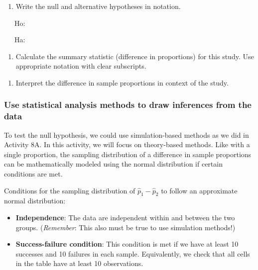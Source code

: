 \documentclass[
]{report}
\providecommand{\tightlist}{%
  \setlength{\itemsep}{0pt}\setlength{\parskip}{0pt}}
\begin{document}
\begin{enumerate}
\def\labelenumi{\arabic{enumi}.}
\setcounter{enumi}{1}
\tightlist
\item
  Write the null and alternative hypotheses in notation.
\end{enumerate}

~~~Ho:

\vspace{0.2in}

~~~Ha:

\vspace{0.2in}

\begin{enumerate}
\def\labelenumi{\arabic{enumi}.}
\setcounter{enumi}{2}
\tightlist
\item
  Calculate the summary statistic (difference in proportions) for this study. Use appropriate notation with clear subscripts.
\end{enumerate}

\vspace{0.5in}

\begin{enumerate}
\def\labelenumi{\arabic{enumi}.}
\setcounter{enumi}{3}
\tightlist
\item
  Interpret the difference in sample proportions in context of the study.
  \vspace{0.8in}
\end{enumerate}

\hypertarget{use-statistical-analysis-methods-to-draw-inferences-from-the-data-3}{%
\subsubsection*{Use statistical analysis methods to draw inferences from the data}\label{use-statistical-analysis-methods-to-draw-inferences-from-the-data-3}}

To test the null hypothesis, we could use simulation-based methods as we did in Activity 8A. In this activity, we will focus on theory-based methods. Like with a single proportion, the sampling distribution of a difference in sample proportions can be mathematically modeled using the normal distribution if certain conditions are met.

Conditions for the sampling distribution of \(\hat{p}_1-\hat{p}_2\) to follow an approximate normal distribution:

\begin{itemize}
\item
  \textbf{Independence}: The data are independent within and between the two groups. (\emph{Remember}: This also must be true to use simulation methods!)
\item
  \textbf{Success-failure condition}: This condition is met if we have at least 10 successes and 10 failures in each sample. Equivalently, we check that all cells in the table have at least 10 observations.
\end{itemize}
\end{document}
